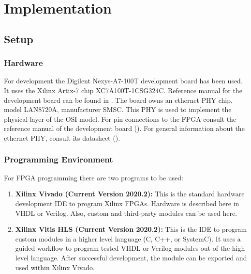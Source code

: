 \section{Implementation}

\subsection{Setup}
\subsubsection{Hardware}
For development the Digilent Nexys-A7-100T development board has been used. It uses the Xilinx Artix-7 chip XC7A100T-1CSG324C. Reference manual for the development board can be found in \cite{digilent:nexys-a7-ref-manual}.
The board owns an ethernet PHY chip, model LAN8720A, manufacturer SMSC. This PHY is used to implement the physical layer of the OSI model. For pin connections to the FPGA consult the reference manual of the development board (\cite{digilent:nexys-a7-ref-manual}). For general information about the ethernet PHY, consult its datasheet (\cite{smsc:lan8720a}).

\subsubsection{Programming Environment}
For FPGA programming there are two programs to be used:
\begin{enumerate}
  \item \textbf{Xilinx Vivado (Current Version 2020.2):} This is the standard hardware development IDE to program Xilinx FPGAs. Hardware is described here in VHDL or Verilog. Also, custom and third-party modules can be used here.
  \item \textbf{Xilinx Vitis HLS (Current Version 2020.2):} This is the IDE to program custom modules in a higher level language (C, C++, or SystemC). It uses a guided workflow to program tested VHDL or Verilog modules out of the high level language. After successful development, the module can be exported and used within Xilinx Vivado.
\end{enumerate}

